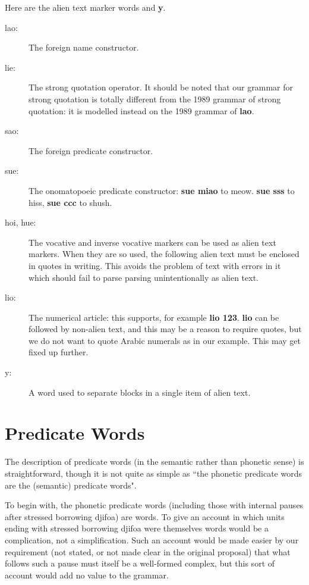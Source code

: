 \documentclass[12pt]{book}
\begin{document}
Here are the alien text marker words and {\bf y}.

\begin{description}

\item[lao:]  The foreign name constructor.

\item[lie:]  The strong quotation operator.  It should be noted that our grammar for strong quotation is totally different from the 1989 grammar of strong quotation:  it is modelled instead on the 1989 grammar of {\bf lao}.

\item[sao:]  The foreign predicate constructor.

\item[sue:]  The onomatopoeic predicate constructor:  {\bf sue miao} to meow. {\bf sue sss} to hiss, {\bf sue ccc} to shush.

\item[hoi, hue:]  The vocative and inverse vocative markers can be used as alien text markers.  When they are so used, the following alien text must be enclosed in quotes in writing.  This avoids the problem of text with errors in it which should fail to parse parsing unintentionally as alien text.

\item[lio:]  The numerical article:  this supports, for example {\bf lio 123}.  {\bf lio} can be followed by non-alien text, and this may be a reason to require quotes, but we do not want to quote Arabic numerals as in our example.  This may get fixed up further.

\item[y:]  A word used to separate blocks in a single item of alien text.

\end{description}

\section{Predicate Words}

The description of predicate words (in the semantic rather than phonetic sense) is straightforward, though it is not quite as simple as ``the phonetic predicate words are the (semantic) predicate words".

To begin with, the phonetic predicate words (including those with internal pauses after stressed borrowing djifoa) are words.  To give an account in which units ending with
stressed borrowing djifoa were themselves words would be a complication, not a simplification.  Such an account would be made easier by our requirement (not stated, or not made clear in the original proposal) that what follows such a pause must itself be a well-formed complex, but this sort of account would add no value to the grammar.
\end{document}
